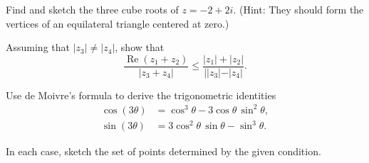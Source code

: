 \documentclass[11pt]{exam}
\DeclareMathOperator{\re}{Re}
\DeclareMathOperator{\im}{Im}
\begin{document}
\begin{questions}
\question Find and sketch the three cube roots of $z=-2+2i$. (Hint:
They should form the vertices of an equilateral triangle centered at
zero.)

\question Assuming that $|z_3| \ne |z_4|$, show that
\[
  \frac{ \re(z_1+z_2)}{|z_3+z_4|} \le \frac{|z_1| +
    |z_2|}{||z_3|-|z_4|}.
\]

\question Use de Moivre's formula to derive the trigonometric
identities
\begin{align*}
  \cos (3\theta) &= \cos^3 \theta - 3 \cos \theta \, \sin^2 \theta, \\
  \sin (3\theta) &= 3 \cos^2 \theta \, \sin \theta -  \sin^3 \theta.
\end{align*}

\question In each case, sketch the set of points determined by the
given condition.
\end{questions}
\end{document}
